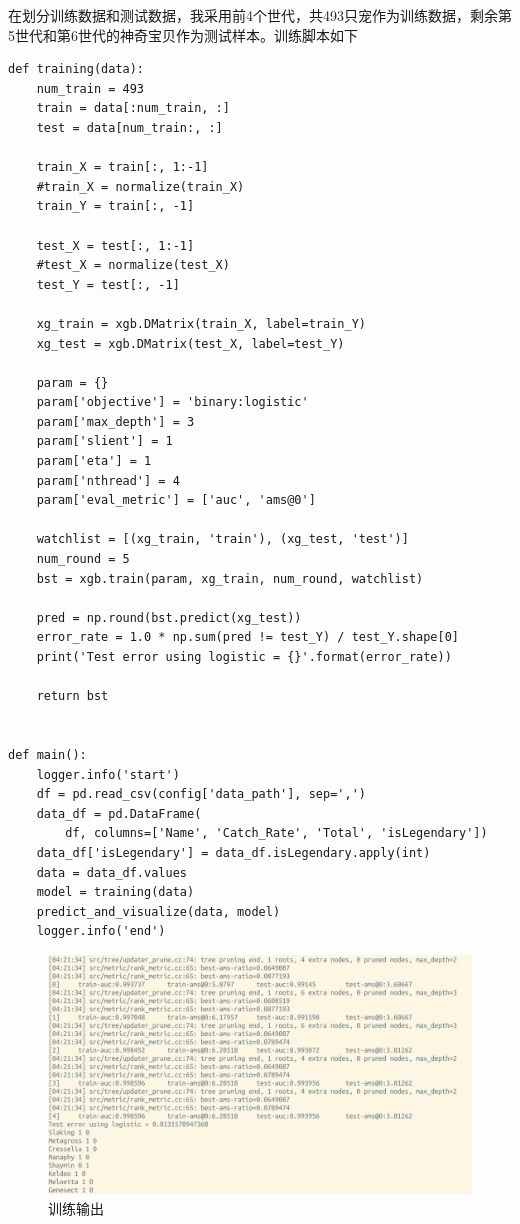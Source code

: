 \documentclass[a4paper, cs4size, oneside]{article}
\begin{document}
在划分训练数据和测试数据，我采用前4个世代，共493只宠作为训练数据，剩余第5世代和第6世代的神奇宝贝作为测试样本。训练脚本如下
\begin{lstlisting}
def training(data):
    num_train = 493
    train = data[:num_train, :]
    test = data[num_train:, :]

    train_X = train[:, 1:-1]
    #train_X = normalize(train_X)
    train_Y = train[:, -1]

    test_X = test[:, 1:-1]
    #test_X = normalize(test_X)
    test_Y = test[:, -1]

    xg_train = xgb.DMatrix(train_X, label=train_Y)
    xg_test = xgb.DMatrix(test_X, label=test_Y)

    param = {}
    param['objective'] = 'binary:logistic'
    param['max_depth'] = 3
    param['slient'] = 1
    param['eta'] = 1
    param['nthread'] = 4
    param['eval_metric'] = ['auc', 'ams@0']

    watchlist = [(xg_train, 'train'), (xg_test, 'test')]
    num_round = 5
    bst = xgb.train(param, xg_train, num_round, watchlist)

    pred = np.round(bst.predict(xg_test))
    error_rate = 1.0 * np.sum(pred != test_Y) / test_Y.shape[0]
    print('Test error using logistic = {}'.format(error_rate))

    return bst


def main():
    logger.info('start')
    df = pd.read_csv(config['data_path'], sep=',')
    data_df = pd.DataFrame(
        df, columns=['Name', 'Catch_Rate', 'Total', 'isLegendary'])
    data_df['isLegendary'] = data_df.isLegendary.apply(int)
    data = data_df.values
    model = training(data)
    predict_and_visualize(data, model)
    logger.info('end')

\end{lstlisting}


\begin{figure}[!htb]
\begin{center}
\includegraphics[width=0.7\linewidth]{figures/screenshot1.png}
\end{center}
   \caption{训练输出}
\label{fig:screenshot1}
\end{figure}
\end{document}
